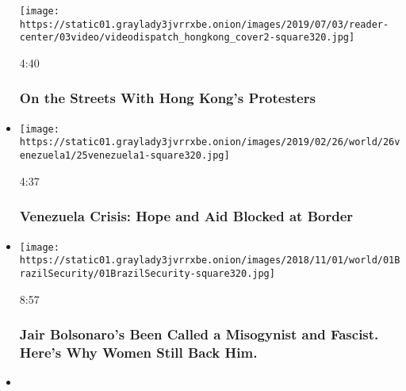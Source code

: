 \begin{itemize}
  \texttt{[image: https://static01.graylady3jvrrxbe.onion/images/2019/07/03/reader-center/03video/videodispatch\_hongkong\_cover2-square320.jpg]}

  4:40

  \hypertarget{on-the-streets-with-hong-kongs-protesters}{%
  \subsubsection{On the Streets With Hong Kong's
  Protesters}\label{on-the-streets-with-hong-kongs-protesters}}
\item
  \href{https://www.nytimes3xbfgragh.onion/video/world/americas/100000006332149/hope-thwarted-along-with-aid-at-venezuelas-border.html?action=click\&module=video-series-bar\&region=header\&pgtype=Article\&playlistId=video/on-the-ground}{}

  \texttt{[image: https://static01.graylady3jvrrxbe.onion/images/2019/02/26/world/26venezuela1/25venezuela1-square320.jpg]}

  4:37

  \hypertarget{venezuela-crisis-hope-and-aid-blocked-at-border}{%
  \subsubsection{Venezuela Crisis: Hope and Aid Blocked at
  Border}\label{venezuela-crisis-hope-and-aid-blocked-at-border}}
\item
  \href{https://www.nytimes3xbfgragh.onion/video/world/americas/100000006128670/hes-been-called-a-misogynist-and-a-fascist-many-women-still-back-him.html?action=click\&module=video-series-bar\&region=header\&pgtype=Article\&playlistId=video/on-the-ground}{}

  \texttt{[image: https://static01.graylady3jvrrxbe.onion/images/2018/11/01/world/01BrazilSecurity/01BrazilSecurity-square320.jpg]}

  8:57

  \hypertarget{jair-bolsonaros-been-called-a-misogynist-and-fascist-heres-why-women-still-back-him}{%
  \subsubsection{Jair Bolsonaro's Been Called a Misogynist and Fascist.
  Here's Why Women Still Back
  Him.}\label{jair-bolsonaros-been-called-a-misogynist-and-fascist-heres-why-women-still-back-him}}
\item
  \href{https://www.nytimes3xbfgragh.onion/video/world/100000007141490/-india-police-pandemic-coronavirus.html?action=click\&module=video-series-bar\&region=header\&pgtype=Article\&playlistId=video/on-the-ground}{}


\end{itemize}
